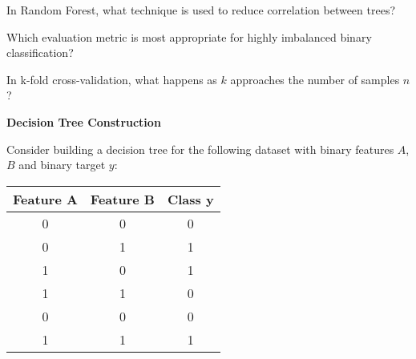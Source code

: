 \documentclass{../../common/quals-template}
\begin{document}
\begin{questions}
\question[1] In Random Forest, what technique is used to reduce correlation between trees?
\begin{choices}
\end{choices}

\question[1] Which evaluation metric is most appropriate for highly imbalanced binary classification?
\begin{choices}
\end{choices}

\question[1] In k-fold cross-validation, what happens as $k$ approaches the number of samples $n$?
\begin{choices}
\end{choices}

\newpage


\question[4] \textbf{Decision Tree Construction}

Consider building a decision tree for the following dataset with binary features $A$, $B$ and binary target $y$:

\begin{center}
\begin{tabular}{ccc}
\toprule
Feature A & Feature B & Class y \\
\midrule
0 & 0 & 0 \\
0 & 1 & 1 \\
1 & 0 & 1 \\
1 & 1 & 0 \\
0 & 0 & 0 \\
1 & 1 & 1 \\
\bottomrule
\end{tabular}
\end{center}

\end{questions}
\end{document}
